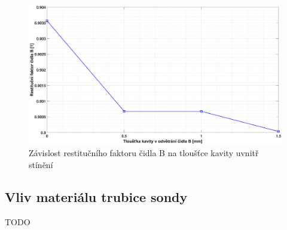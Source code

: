         \begin{figure}[ht!]
            \centering
            \includegraphics*[width=\textwidth, trim={5.25cm 1.0cm 5.8cm 2.0cm}]{400_SIMULACE_KONSTRUKCNICH_UPRAV/Grafy/kavita_B.eps}
            \caption{Závislost restitučního faktoru čidla B na tloušťce kavity uvnitř stínění}
            \label{fig:kavita-B-graf}
        \end{figure}
    
    \newpage
    \subsection{Vliv materiálu trubice sondy}
        TODO
    
